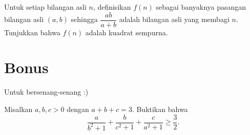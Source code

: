 \documentclass[12pt]{scrartcl}
\begin{document}
	\begin{soalbaru}
	Untuk setiap bilangan asli $n$, definisikan $f(n)$ sebagai banyaknya pasangan bilangan asli $(a,b)$ sehingga $\dfrac{ab}{a+b}$ adalah bilangan asli yang membagi $n$. Tunjukkan bahwa $f(n)$ adalah kuadrat sempurna.
	\end{soalbaru}
	
	\section{Bonus}
	Untuk bersenang-senang :)
	\begin{soalbaru}
	Misalkan $a,b,c > 0$ dengan $a+b+c=3$. Buktikan bahwa 
	$$\dfrac{a}{b^2+1}+\dfrac{b}{c^2+1}+\dfrac{c}{a^2+1} \ge \dfrac{3}{2}.$$
	\end{soalbaru}
\end{document}
